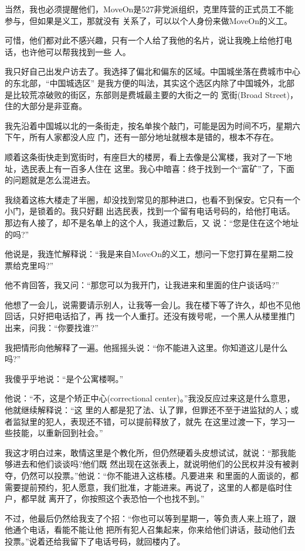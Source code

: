 ﻿\documentclass[11pt]{article}
\begin{document}
当然，我也必须提醒他们，MoveOn是527非党派组织，克里阵营的正式员工不能参与，但如果是义工，那就没有
关系了，可以以个人身份来做MoveOn的义工。

可惜，他们都对此不感兴趣，只有一个人给了我他的名片，说让我晚上给他打电话，也许他可以帮我找到一些
人。

我只好自己出发户访去了。我选择了偏北和偏东的区域。中国城坐落在费城市中心的东北部，``中国城选区''
是我方便的叫法，其实这个选区内除了中国城外，北部是比较荒凉破败的街区，东部则是费城最主要的大街之一的
宽街(Broad Street)，住的大部分是非亚裔。

我先沿着中国城以北的一条街走，按名单挨个敲门，可能是因为时间不巧，星期六下午，所有人家都没人应
门，还有一部分地址就根本是错的，根本不存在。

顺着这条街快走到宽街时，有座巨大的楼房，看上去像是公寓楼，我对了一下地址，选民表上有一百多人住在
这里。我心中暗喜：终于找到一个``富矿''了，下面的问题就是怎么混进去。

我绕着这栋大楼走了半圈，却没找到常见的那种进口，也看不到保安。它只有一个小门，是锁着的。我只好翻
出选民表，找到一个留有电话号码的，给他打电话。那边有人接了，却不是名单上的这个人，我道过歉后，又
说：``您是住在这个地址的吗?''

他说是，我连忙解释说：``我是来自MoveOn的义工，想问一下您打算在星期二投票给克里吗?''

他不肯回答，我又问：``那您可以为我开门，让我进来和里面的住户谈话吗?''

他想了一会儿，说需要请示别人，让我等一会儿。我在楼下等了许久，却也不见他回话，只好把电话掐了，再
找一个人重打。还没有拨号呢，一个黑人从楼里推门出来，问我：``你要找谁?''

我把情形向他解释了一遍。他摇摇头说：``你不能进入这里。你知道这儿是什么吗?''

我傻乎乎地说：``是个公寓楼啊。''

他说：``不，这是个矫正中心(correctional center)。''我没反应过来这是什么意思，他就继续解释说：``这
里的人都是犯了法、认了罪，但罪还不至于进监狱的人；或者监狱里的犯人，表现还不错，可以提前释放了，就先
在这里过渡一下，学习一些技能，以重新回到社会。''

我这才明白过来，敢情这里是个教化所，但仍然硬着头皮想试试，就说：``那我能够进去和他们谈谈吗?他们既
然出现在这张表上，就说明他们的公民权并没有被剥夺，仍然可以投票。''他说：``你不能进入这栋楼。凡要进来
和里面的人面谈的，都需要提前预约，犯人愿意，我们批准，才能进来。再说了，这里的人都是临时住户，都早就
离开了，你按照这个表恐怕一个也找不到。''

不过，他最后仍然给我支了个招：``你也可以等到星期一，等负责人来上班了，跟他通个电话，看能不能让他
把所有犯人召集起来，你来给他们讲话，鼓动他们去投票。''说着还给我留下了电话号码，就回楼内了。
\end{document}
